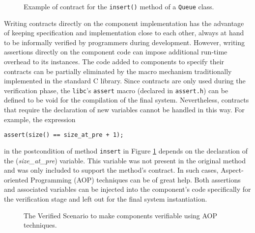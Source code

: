 \documentclass{sig-alternate}
\newcommand{\fig}[4][ht]{
  \begin{figure}[#1] {\centering\scalebox{#2}{\texttt{[image: fig/\#3]}}\par}
    \caption{#4\label{fig:#3}}
  \end{figure}
}
\newcommand{\progcpp}[3][tbp]{
 \begin{figure}[#1]
     
   \caption{#3\label{progcpp:#2}}
 \end{figure}
}
\begin{document}
\progcpp{contract_example}{Example of contract for the \texttt{insert()}
  method of a \texttt{Queue} class.}

Writing contracts directly on the component implementation has the
advantage of keeping specification and implementation close to each
other, always at hand to be informally verified by programmers during
development. However, writing assertions directly on the component code
can impose additional run-time overhead to its instances. The code added
to components to specify their contracts can be partially eliminated by
the macro mechanism traditionally implemented in the standard C library.
Since contracts are only used during the verification phase, the
\texttt{libc}'s \texttt{assert} macro (declared in \texttt{assert.h})
can be defined to be void for the compilation of the final system.
Nevertheless, contracts that require the declaration of new variables
cannot be handled in this way. For example, the expression
\begin{verbatim}
assert(size() == size_at_pre + 1);
\end{verbatim}
in the postcondition of method \texttt{insert} in Figure
\ref{progcpp:contract_example} depends on the declaration of the
(\emph{size\_at\_pre}) variable. This variable was not present in the
original method and was only included to support the method's contract.
In such cases, Aspect-oriented Programming (AOP) techniques can be of
great help. Both assertions and associated variables can be injected into
the component's code specifically for the verification stage and left
out for the final system instantiation.

\fig{.4}{verified_scenario}{The Verified Scenario to make components
  verifiable using AOP techniques.}
\end{document}
